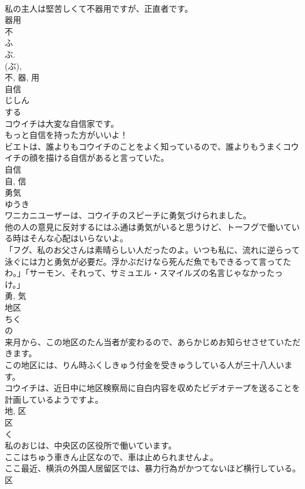 \documentclass[8pt]{extreport}
\begin{document}
\begin{CJK}{UTF8}{min}
\\	私の主人は堅苦しくて不器用ですが、正直者です。	
\\	器用 
\\	不 
\\	ふ 
\\	ぶ. 
\\	(ぶ), 
\\	不, 器, 用	
\\	自信	
\\	じしん	
\\	する 
\\	コウイチは大変な自信家です。	
\\	もっと自信を持った方がいいよ！	
\\	ビエトは、誰よりもコウイチのことをよく知っているので、誰よりもうまくコウイチの顔を描ける自信があると言っていた。	
\\	自信 
\\	自, 信	
\\	勇気	
\\	ゆうき	
\\	ワニカニユーザーは、コウイチのスピーチに勇気づけられました。	
\\	他の人の意見に反対するにはふ通は勇気がいると思うけど、トーフグで働いている時はそんな心配はいらないよ。	
\\	「フグ、私のお父さんは素晴らしい人だったのよ。いつも私に、流れに逆らって泳ぐには力と勇気が必要だ。浮かぶだけなら死んだ魚でもできるって言ってたわ。」「サーモン、それって、サミュエル・スマイルズの名言じゃなかったっけ。」	
\\	勇, 気	
\\	地区	
\\	ちく	
\\	の 
\\	来月から、この地区のたん当者が変わるので、あらかじめお知らせさせていただきます。	
\\	この地区には、りん時ふくしきゅう付金を受きゅうしている人が三十八人います。	
\\	コウイチは、近日中に地区検察局に自白内容を収めたビデオテープを送ることを計画しているようですよ。	
\\	地, 区	
\\	区	
\\	く	
\\	私のおじは、中央区の区役所で働いています。	
\\	ここはちゅう車きん止区なので、車は止められませんよ。	
\\	ここ最近、横浜の外国人居留区では、暴力行為がかつてないほど横行している。	
\\	区	

\end{CJK}
\end{document}
